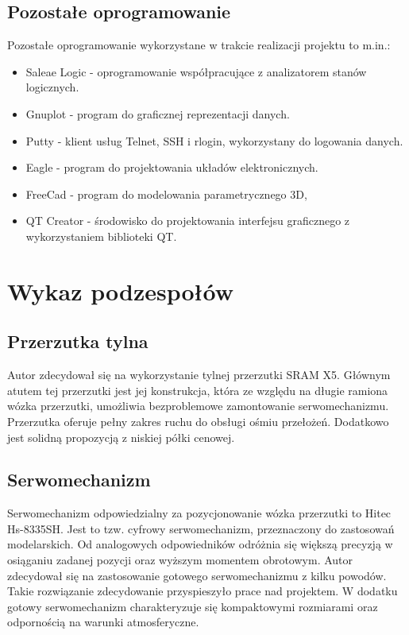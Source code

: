\subsection{Pozostałe oprogramowanie}
Pozostałe oprogramowanie wykorzystane w trakcie realizacji projektu to m.in.:
\begin{itemize}
\item
Saleae Logic - oprogramowanie współpracujące z analizatorem stanów logicznych.
\item
Gnuplot - program do graficznej reprezentacji danych.
\item
Putty - klient usług Telnet, SSH i rlogin, wykorzystany do logowania danych.
\item
Eagle - program do projektowania układów elektronicznych.
\item
FreeCad - program do modelowania parametrycznego 3D,
\item
QT Creator - środowisko do projektowania interfejsu graficznego z wykorzystaniem biblioteki QT.
\end{itemize}
\section{Wykaz podzespołów}
\subsection{Przerzutka tylna}
Autor zdecydował się na wykorzystanie tylnej przerzutki SRAM X5. Głównym atutem tej przerzutki jest jej konstrukcja, która ze względu na długie ramiona wózka przerzutki, umożliwia bezproblemowe zamontowanie serwomechanizmu. Przerzutka oferuje pełny zakres ruchu do obsługi ośmiu przełożeń. Dodatkowo jest solidną propozycją z niskiej półki cenowej.
\subsection{Serwomechanizm}
Serwomechanizm odpowiedzialny za pozycjonowanie wózka przerzutki to Hitec Hs-8335SH. Jest to tzw. cyfrowy serwomechanizm, przeznaczony do zastosowań modelarskich. Od analogowych odpowiedników odróżnia się większą precyzją w osiąganiu zadanej pozycji oraz wyższym momentem obrotowym. Autor zdecydował się na zastosowanie gotowego serwomechanizmu z kilku powodów. Takie rozwiązanie zdecydowanie przyspieszyło prace nad projektem. W dodatku gotowy serwomechanizm charakteryzuje się kompaktowymi rozmiarami oraz odpornością na warunki atmosferyczne.  

